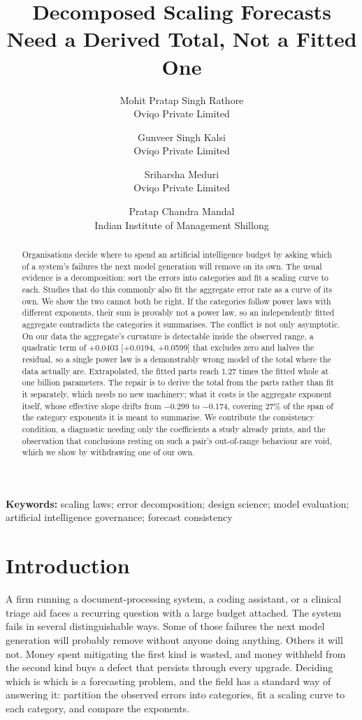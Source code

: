\documentclass[11pt]{article}
\title{\bf Decomposed Scaling Forecasts Need a Derived Total, Not a Fitted One}
\author{
    Mohit Pratap Singh Rathore\\ \small Oviqo Private Limited
    \and
    Gunveer Singh Kalsi\\ \small Oviqo Private Limited
    \and
    Sriharsha Meduri\\ \small Oviqo Private Limited
    \and
    Pratap Chandra Mandal\\ \small Indian Institute of Management Shillong
  }
\date{}
\begin{document}
\maketitle

\begin{abstract}
Organisations decide where to spend an artificial intelligence budget by asking
which of a system's failures the next model generation will remove on its own. The
usual evidence is a decomposition: sort the errors into categories and fit a scaling
curve to each. Studies that do this commonly also fit the aggregate error rate as a
curve of its own. We show the two cannot both be right. If the categories follow
power laws with different exponents, their sum is provably not a power law, so an
independently fitted aggregate contradicts the categories it summarises. The
conflict is not only asymptotic. On our data the aggregate's curvature is
detectable inside the observed range, a quadratic term of +0.0403
[+0.0194, +0.0599] that excludes zero and halves the residual, so a
single power law is a demonstrably wrong model of the total where the data actually
are. Extrapolated, the fitted parts reach 1.27 times the fitted whole
at one billion parameters. The repair is to derive the total from the parts rather
than fit it separately, which needs no new machinery; what it costs is the aggregate
exponent itself, whose effective slope drifts from $-$0.299 to
$-$0.174, covering 27\% of the span of the category
exponents it is meant to summarise. We contribute the consistency condition, a
diagnostic needing only the coefficients a study already prints, and the observation
that conclusions resting on such a pair's out-of-range behaviour are void, which we
show by withdrawing one of our own.
\end{abstract}

\vspace{0.5em}
\noindent\textbf{Keywords:} scaling laws; error decomposition; design science;
model evaluation; artificial intelligence governance; forecast consistency

\section{Introduction}
\label{sec:intro}

A firm running a document-processing system, a coding assistant, or a clinical
triage aid faces a recurring question with a large budget attached. The system
fails in several distinguishable ways. Some of those failures the next model
generation will probably remove without anyone doing anything. Others it will not.
Money spent mitigating the first kind is wasted, and money withheld from the second
kind buys a defect that persists through every upgrade. Deciding which is which is
a forecasting problem, and the field has a standard way of answering it: partition
the observed errors into categories, fit a scaling curve to each category, and
compare the exponents.
\end{document}
